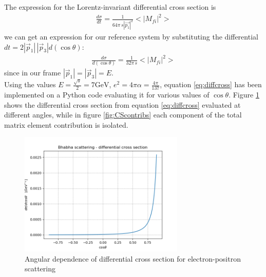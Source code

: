 \documentclass[10pt,a4paper]{article}
\begin{document}
The expression for the Lorentz-invariant differential cross section is
\begin{align*}
\frac{d\sigma}{dt} = \frac{1}{64\pi\,s|\vec{p_1}|^2}<|M_{fi}|^2>
\end{align*}
we can get an expression for our reference system by substituting the differential
$dt = 2|\vec{p}_1|\,|\vec{p}_3|d(\cos\theta)$:
\begin{align}
\label{eq:diffcross}
\frac{d\sigma}{d(\cos\theta)} = \frac{1}{32\pi\,s}<|M_{fi}|^2>
\end{align}
since in our frame $|\vec{p}_1|=|\vec{p}_3|=E$.\\

Using the values $E = \frac{\sqrt{s}}{2} = 7\si{\giga\electronvolt}$, $e^2=4\pi\alpha = \frac{4\pi}{137}$, equation \ref{eq:diffcross} has been implemented on a Python code evaluating it for various values of $\cos\theta$. Figure \ref{fig:crossection} shows the differential cross section from equation \ref{eq:diffcross} evaluated at different angles, while in figure \ref{fig:CScontribs} each component of the total matrix element contribution is isolated.

\begin{figure}[!ht]
\centering
\includegraphics[width=0.7\textwidth]{figures/differentialCS.png}
\caption{Angular dependence of differential cross section for electron-positron scattering}
\label{fig:crossection}
\end{figure}
\end{document}
